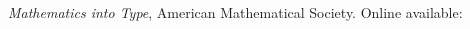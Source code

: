 \begin{thebibliography}{1}

{\it{Mathematics into Type}}, American Mathematical Society. Online available: 

\end{thebibliography}